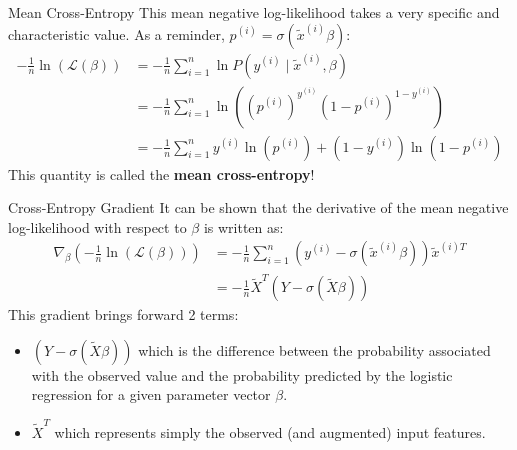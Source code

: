\begin{frame}{Mean Cross-Entropy}
	This mean negative log-likelihood takes a very specific and characteristic value. As a reminder, $p^{(i)} = \sigma(\tilde{x}^{(i)} \beta)$:
	\begin{equation}
		\begin{aligned}
			-\frac{1}{n} \ln{\left(\mathcal{L}(\beta)\right)} 
			&= - \frac{1}{n} \sum_{i=1}^n \ln{P(y^{(i)} \mid \tilde{x}^{(i)}, \beta)} \\
			&= - \frac{1}{n} \sum_{i=1}^n \ln{\left(\left(p^{(i)}\right)^{y^{(i)}} \left(1 - p^{(i)}\right)^{1 - y^{(i)}}\right)} \\
			&= - \frac{1}{n} \sum_{i=1}^n y^{(i)} \ln{\left(p^{(i)}\right)} + (1 - y^{(i)}) \ln{\left(1 - p^{(i)}\right)}
		\end{aligned}
		\nonumber
	\end{equation}
	This quantity is called the \textbf{mean cross-entropy}!
\end{frame}

\begin{frame}{Cross-Entropy Gradient}
	It can be shown that the derivative of the mean negative log-likelihood with respect to $\beta$ is written as:
	\begin{equation}
		\begin{aligned}
			\nabla_{\beta}\left(- \frac{1}{n} \ln{\left(\mathcal{L}(\beta)\right)}\right) 
			&= - \frac{1}{n} \sum_{i=1}^n \left(y^{(i)} - \sigma(\tilde{x}^{(i)} \beta)\right) \tilde{x}^{(i)T} \\
			&= - \frac{1}{n} \tilde{X}^T \left(Y - \sigma\left(\tilde{X} \beta\right)\right)
		\end{aligned}
		\nonumber
	\end{equation}
	This gradient brings forward 2 terms:
	\begin{itemize}
		\item $\left(Y - \sigma\left(\tilde{X} \beta\right)\right)$ which is the difference between the probability associated with the observed value and the probability predicted by the logistic regression for a given parameter vector $\beta$.
		\item $\tilde{X}^T$ which represents simply the observed (and augmented) input features.
	\end{itemize}
\end{frame}

